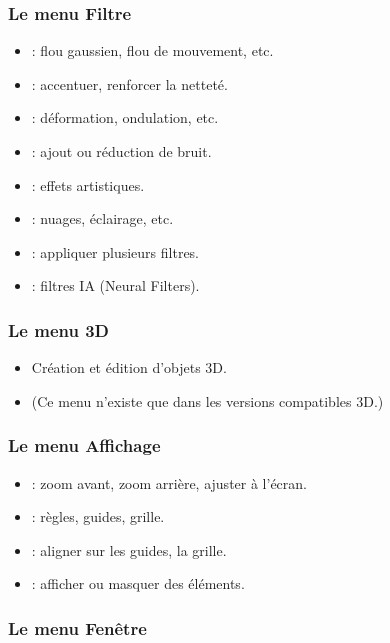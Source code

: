 \subsubsection{Le menu Filtre}

\begin{itemize}
    \item {} : flou gaussien, flou de mouvement, etc.
    \item {} : accentuer, renforcer la netteté.
    \item {} : déformation, ondulation, etc.
    \item {} : ajout ou réduction de bruit.
    \item {} : effets artistiques.
    \item {} : nuages, éclairage, etc.
    \item {} : appliquer plusieurs filtres.
    \item {} : filtres IA (Neural Filters).
\end{itemize}

\subsubsection{Le menu 3D}

\begin{itemize}
    \item Création et édition d'objets 3D.
    \item (Ce menu n'existe que dans les versions compatibles 3D.)
\end{itemize}

\subsubsection{Le menu Affichage}

\begin{itemize}
    \item {} : zoom avant, zoom arrière, ajuster à l'écran.
    \item {} : règles, guides, grille.
    \item {} : aligner sur les guides, la grille.
    \item {} : afficher ou masquer des éléments.
\end{itemize}

\subsubsection{Le menu Fenêtre}

